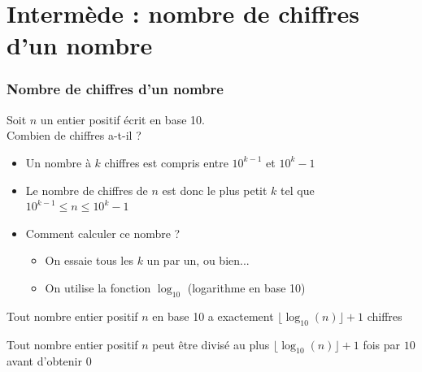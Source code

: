 \documentclass[12pt]{linfo-beamer}
\begin{document}
\section{Intermède : nombre de chiffres d'un nombre}


\begin{frame}
  \frametitle{Nombre de chiffres d'un nombre}

  Soit $n$ un entier positif écrit en base 10.\\
  Combien de chiffres a-t-il ?
  \begin{itemize}
  \item Un nombre à $k$ chiffres est compris entre $10^{k-1}$ et ${10^k}-1$
  \item Le nombre de chiffres de $n$ est donc le plus petit $k$ tel que $10^{k-1} \leq n \leq {10^k}-1$
  \item Comment calculer ce nombre ? \pause
  \begin{itemize}
    \item On essaie tous les $k$ un par un, ou bien... \pause
    \item On utilise la fonction $\log_{10}$ (logarithme en base 10)
  \end{itemize}
  \end{itemize}

  \vfill

  \begin{beamerboxesrounded}{}
   Tout nombre entier positif $n$ en base 10 a
  exactement $\lfloor \log_{10}(n) \rfloor + 1$ chiffres
  \end{beamerboxesrounded}

  \pause
  \vfill

  \begin{beamerboxesrounded}{}
   Tout nombre entier positif $n$ peut être
  divisé au plus $\lfloor \log_{10}(n) \rfloor + 1$ fois par $10$ avant
  d'obtenir $0$
  \end{beamerboxesrounded}

\end{frame}
\end{document}
